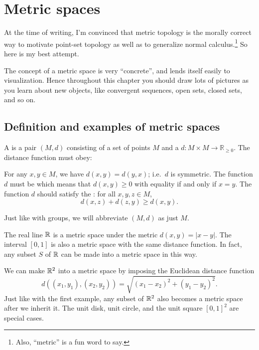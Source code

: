 \chapter{Metric spaces}
\label{ch:metric_space}
At the time of writing, I'm convinced that metric topology is
the morally correct way to motivate point-set topology
as well as to generalize normal calculus.\footnote{Also,
``metric'' is a fun word to say.}
So here is my best attempt.

The concept of a metric space is very ``concrete'', and lends itself easily to visualization.
Hence throughout this chapter you should draw lots of pictures as you learn about new objects,
like convergent sequences, open sets, closed sets, and so on.

\section{Definition and examples of metric spaces}
\begin{definition}
	A  is a pair $(M, d)$ consisting of
	a set of points $M$
	and a  $d \colon M \times M \to \mathbb R_{\ge 0}$.
	The distance function must obey:
	\begin{itemize}
		\ii For any $x,y \in M$, we have $d(x,y) = d(y,x)$; i.e.\ $d$ is symmetric.
		\ii The function $d$ must be 
		which means that $d(x,y) \ge 0$ with equality if and only if $x=y$.
		\ii The function $d$ should satisfy the : for all $x,y,z \in M$,
		\[ d(x,z) + d(z,y) \ge d(x,y). \]
	\end{itemize}
\end{definition}
\begin{abuse}
	Just like with groups, we will abbreviate $(M,d)$ as just $M$.
\end{abuse}
\begin{example}
	\listhack
	\begin{enumerate}[(a)]
		\ii The real line $\mathbb R$ is a metric space under the metric $d(x,y) = \left\lvert x-y \right\rvert$.
		\ii The interval $[0,1]$ is also a metric space with the same distance function.
		\ii In fact, any subset $S$ of $\mathbb R$ can be made into a metric space in this way.
	\end{enumerate}
\end{example}
\begin{example}
	\listhack
	\begin{enumerate}[(a)]
		\ii We can make $\mathbb R^2$ into a metric space by imposing the Euclidean distance function
		\[ d\left( (x_1, y_1), (x_2, y_2) \right) = \sqrt{(x_1-x_2)^2 + (y_1-y_2)^2}. \]
		\ii Just like with the first example, any subset of $\mathbb R^2$ also becomes a metric space after we inherit it.
		The unit disk, unit circle, and the unit square $[0,1]^2$
		are special cases.
	\end{enumerate}
\end{example}
